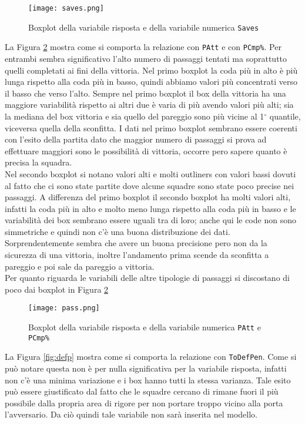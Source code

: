 \begin{figure}[htbp]
	\begin{center}
		\texttt{[image: saves.png]}
		\caption{Boxplot della variabile risposta e della variabile numerica \texttt{Saves} } \label{fig:saves}
	\end{center}
\end{figure}

La Figura \ref{fig:pass} mostra come si comporta la relazione con \texttt{PAtt} e con \texttt{PCmp\%}. Per entrambi sembra significativo l'alto numero di passaggi tentati ma soprattutto quelli completati ai fini della vittoria. Nel primo boxplot la coda più in alto è più lunga rispetto alla coda più in basso, quindi abbiamo valori più concentrati verso il basso che verso l'alto. Sempre nel primo boxplot il box della vittoria ha una maggiore variabilità rispetto ai altri due è varia di più avendo valori più alti; sia la mediana del box vittoria e sia quello del pareggio sono più vicine al 1${^\circ}$ quantile, viceversa quella della sconfitta. I dati nel primo boxplot sembrano essere coerenti con l'esito della partita dato che maggior numero di passaggi si prova ad effettuare maggiori sono le possibilità di vittoria, occorre pero sapere quanto è precisa la squadra.\\
Nel secondo boxplot si notano valori alti e molti outliners con valori bassi dovuti al fatto che ci sono state partite dove alcune squadre sono state poco precise nei passaggi. A differenza del primo boxplot il secondo boxplot ha molti valori alti, infatti la coda più in alto e molto meno lunga rispetto alla coda più in basso e le variabilità dei box sembrano essere uguali tra di loro; anche qui le code non sono simmetriche e quindi non c'è una buona distribuzione dei dati. Sorprendentemente sembra che avere un buona precisione pero non da la sicurezza di una vittoria, inoltre l'andamento prima scende da sconfitta a pareggio e poi sale da pareggio a vittoria.\\
Per quanto riguarda le variabili delle altre tipologie di passaggi si discostano di poco dai boxplot in Figura \ref{fig:pass}

\begin{figure}[htbp]
	\begin{center}
		\texttt{[image: pass.png]}
		\caption{Boxplot della variabile risposta e della variabile numerica \texttt{PAtt} e \texttt{PCmp\%}  } \label{fig:pass}
	\end{center}
\end{figure}
\bigskip
La Figura \ref{fig:defp} mostra come si comporta la relazione con \texttt{ToDefPen}. Come si può notare questa non è per nulla significativa per la variabile risposta, infatti non c'è una minima variazione e i box hanno tutti la stessa varianza. Tale esito può essere giustificato dal fatto che le squadre cercano di rimane fuori il più possibile dalla propria area di rigore per non portare troppo vicino alla porta l'avversario. Da ciò quindi tale variabile non sarà inserita nel modello.\\

